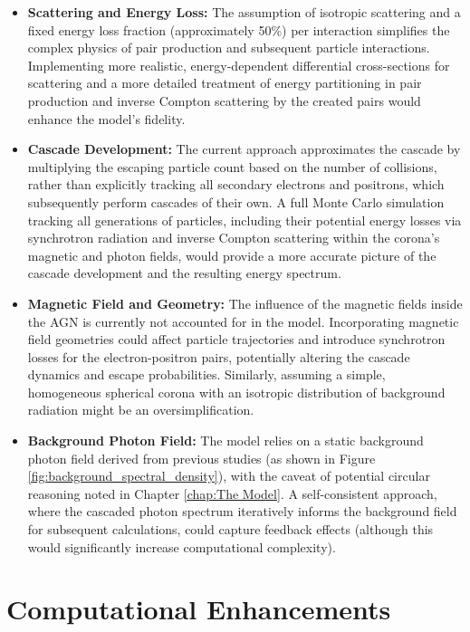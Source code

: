 \begin{itemize}
    \item \textbf{Scattering and Energy Loss:} The assumption of isotropic scattering and a fixed energy loss fraction (approximately 50\%) per interaction simplifies the complex physics of pair production and subsequent particle interactions. Implementing more realistic, energy-dependent differential cross-sections for scattering and a more detailed treatment of energy partitioning in pair production and inverse Compton scattering by the created pairs would enhance the model's fidelity.
    \item \textbf{Cascade Development:} The current approach approximates the cascade by multiplying the escaping particle count based on the number of collisions, rather than explicitly tracking all secondary electrons and positrons, which subsequently perform cascades of their own. A full Monte Carlo simulation tracking all generations of particles, including their potential energy losses via synchrotron radiation and inverse Compton scattering within the corona's magnetic and photon fields, would provide a more accurate picture of the cascade development and the resulting energy spectrum.
    \item \textbf{Magnetic Field and Geometry:} The influence of the magnetic fields inside the AGN is currently not accounted for in the model. Incorporating magnetic field geometries could affect particle trajectories and introduce synchrotron losses for the electron-positron pairs, potentially altering the cascade dynamics and escape probabilities. Similarly, assuming a simple, homogeneous spherical corona with an isotropic distribution of background radiation might be an oversimplification.
    \item \textbf{Background Photon Field:} The model relies on a static background photon field derived from previous studies (as shown in Figure \ref{fig:background_spectral_density}), with the caveat of potential circular reasoning noted in Chapter \ref{chap:The Model}. A self-consistent approach, where the cascaded photon spectrum iteratively informs the background field for subsequent calculations, could capture feedback effects (although this would significantly increase computational complexity).
\end{itemize}

\section{Computational Enhancements}

